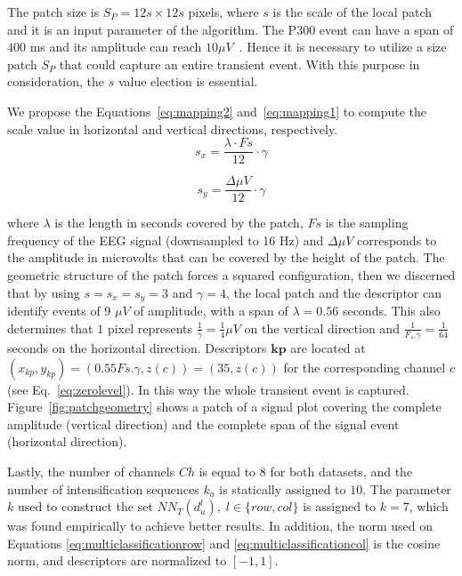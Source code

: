 \documentclass[utf8]{frontiersSCNS} %
\begin{document}
The patch size is $S_P = 12s \times 12s$ pixels, where $s$ is the scale of the local patch and it is an input parameter of the algorithm. The P300 event can have a span of $400$ ms and its amplitude can reach $ 10 \mu V $~\citep{Rao2013}.  Hence it is necessary to utilize a size patch $S_P$ that could capture an entire transient event. With this purpose in consideration, the $s$ value election is essential.

We propose the Equations~\ref{eq:mapping2} and~\ref{eq:mapping1} to compute the scale value in horizontal and vertical directions, respectively. 
\begin{equation}
s_x = \frac{\lambda \cdot Fs}{12} \cdot \gamma
\label{eq:mapping2}
\end{equation}

\begin{equation}
s_y= \frac{\Delta \mu V}{12} \cdot \gamma 
\label{eq:mapping1}
\end{equation}


\noindent where $ \lambda $ is the length in seconds covered by the patch, $ Fs $ is the sampling frequency of the EEG signal (downsampled to 16 Hz) and  $\Delta  \mu V $ corresponds to the amplitude in microvolts that can be covered by the height of the patch. The geometric structure of the patch forces a squared configuration, then we discerned that by using $ s =s_x =s_y = 3 $ and $ \gamma = 4 $,  the local patch and the descriptor can identify events of 9 $ \mu V $ of amplitude, with a span of $ \lambda = 0.56$ seconds.  This also determines that $ 1 $ pixel represents $ \frac{1}{\gamma}= \frac{1}{4} \mu V $ on the vertical direction and $\frac{1}{F_s.\gamma}=\frac{1}{64}$ seconds on the horizontal direction. Descriptors  $\mathbf{kp}$  are located at $ (x_{kp}, y_{kp} )= ( 0.55 Fs.\gamma, z(c) )= (35,  z(c)) $ for the corresponding channel $c$ (see Eq.~\ref{eq:zerolevel}).   In this way the whole transient event is captured. 
Figure~\ref{fig:patchgeometry} shows a patch of a signal plot covering the complete amplitude (vertical direction) and the complete span of the signal event (horizontal direction). 

Lastly, the number of channels $Ch$ is equal to $8$ for both datasets, and the number of intensification sequences $k_a$ is statically assigned to $10$.  The parameter $k$ used to construct the set $NN_T(d^l_u), \;l\in\{row,{col}\}$ is assigned to $k=7$, which was found empirically to achieve better results.  In addition, the norm used on  Equations \ref{eq:multiclassificationrow} and \ref{eq:multiclassificationcol} is the cosine norm, and descriptors are normalized to $ \left[ -1, 1 \right] $.
\end{document}
